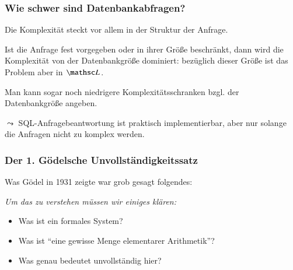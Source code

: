 \documentclass[onlymath]{beamer}
\begin{document}
\begin{frame}\frametitle{Wie schwer sind Datenbankabfragen?}

\bigskip

Die Komplexität steckt vor allem in der Struktur der Anfrage.\bigskip

Ist die Anfrage fest vorgegeben oder in ihrer Größe beschränkt, dann wird die Komplexität von der Datenbankgröße dominiert: bezüglich dieser Größe ist das Problem aber in $\LogSpace$.\bigskip

Man kann sogar noch niedrigere Komplexitätsschranken bzgl. der Datenbankgröße angeben.
\bigskip

\alert{$\leadsto$ SQL-Anfragebeantwortung ist praktisch implementierbar, aber nur solange die Anfragen nicht zu komplex werden.}

\end{frame}





\begin{frame}\frametitle{Der 1. Gödelsche Unvollständigkeitssatz}

Was Gödel in 1931 zeigte war grob gesagt folgendes:\medskip

\bigskip

\emph{Um das zu verstehen müssen wir einiges klären:}
\begin{itemize}
\item Was ist ein \alert{formales System}?
\item Was ist \alert{"`eine gewisse Menge elementarer Arithmetik"'}?
\item Was genau bedeutet \alert{unvollständig} hier?
\end{itemize}

\end{frame}
\end{document}
